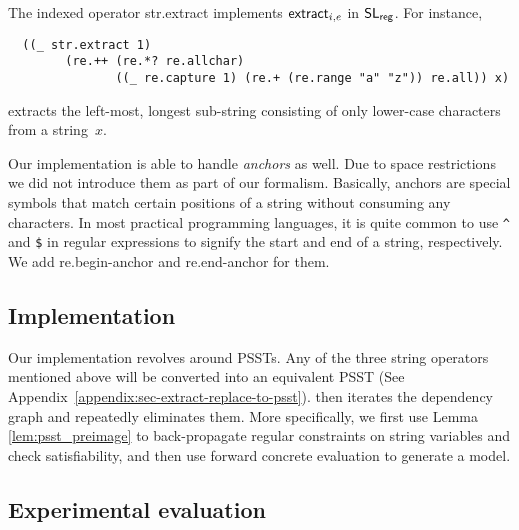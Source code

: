 The indexed operator {\sf str.extract} implements $\mathsf{extract}_{i, e}$ in
$\mathsf{SL}_{\sf reg}$. For instance,
%
{\small
\begin{verbatim}
  ((_ str.extract 1)
        (re.++ (re.*? re.allchar)
               ((_ re.capture 1) (re.+ (re.range "a" "z")) re.all)) x)
\end{verbatim}
}
extracts the left-most, longest sub-string consisting of only lower-case
characters from a string~$x$.

Our implementation is able to handle \textit{anchors} as well. Due to space restrictions we did not introduce them as part of our formalism. Basically, anchors are special symbols that match certain positions of a string without consuming any characters. In most practical programming languages, it is quite common to use \verb!^! and \verb!$! in regular expressions to signify the start and end of a string, respectively. We add \textsf{re.begin-anchor} and \textsf{re.end-anchor} for them.

\subsection{Implementation}

Our implementation revolves around PSSTs. Any of the three string operators mentioned above will be converted into an equivalent PSST (See Appendix~\ref{appendix:sec-extract-replace-to-psst}). {\ostrich} then iterates the dependency graph and repeatedly eliminates them. More specifically, we first use Lemma \ref{lem:psst_preimage} to back-propagate regular constraints on string variables and check satisfiability, and then use forward concrete evaluation to generate a model. 

\subsection{Experimental evaluation}

